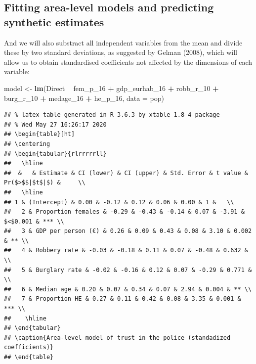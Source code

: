 \documentclass[
]{article}
\newenvironment{Shaded}{\begin{snugshade}}{\end{snugshade}}
\newcommand{\DataTypeTok}[1]{\textcolor[rgb]{0.13,0.29,0.53}{#1}}
\newcommand{\DecValTok}[1]{\textcolor[rgb]{0.00,0.00,0.81}{#1}}
\newcommand{\KeywordTok}[1]{\textcolor[rgb]{0.13,0.29,0.53}{\textbf{#1}}}
\newcommand{\NormalTok}[1]{#1}
\newcommand{\OperatorTok}[1]{\textcolor[rgb]{0.81,0.36,0.00}{\textbf{#1}}}
\newcommand{\StringTok}[1]{\textcolor[rgb]{0.31,0.60,0.02}{#1}}
\begin{document}
\hypertarget{fitting-area-level-models-and-predicting-synthetic-estimates}{%
\subsection{Fitting area-level models and predicting synthetic
estimates}\label{fitting-area-level-models-and-predicting-synthetic-estimates}}

And we will also substract all independent variables from the mean and
divide these by two standard deviations, as suggested by Gelman (2008),
which will allow us to obtain standardised coefficients not affected by
the dimensions of each variable:

\begin{Shaded}
\begin{Highlighting}[]
\NormalTok{model <-}\StringTok{ }\KeywordTok{lm}\NormalTok{(Direct }\OperatorTok{~}\StringTok{  }\NormalTok{fem_p_}\DecValTok{16}  \OperatorTok{+}\StringTok{ }\NormalTok{gdp_eurhab_}\DecValTok{16} \OperatorTok{+}\StringTok{ }\NormalTok{robb_r_}\DecValTok{10} \OperatorTok{+}\StringTok{ }
\StringTok{                      }\NormalTok{burg_r_}\DecValTok{10} \OperatorTok{+}\StringTok{  }\NormalTok{medage_}\DecValTok{16}    \OperatorTok{+}\StringTok{ }\NormalTok{he_p_}\DecValTok{16}\NormalTok{, }
            \DataTypeTok{data =}\NormalTok{ pop)}
\end{Highlighting}
\end{Shaded}

\begin{verbatim}
## % latex table generated in R 3.6.3 by xtable 1.8-4 package
## % Wed May 27 16:26:17 2020
## \begin{table}[ht]
## \centering
## \begin{tabular}{rlrrrrrll}
##   \hline
##  &   & Estimate & CI (lower) & CI (upper) & Std. Error & t value & Pr($>$$|$t$|$) &     \\ 
##   \hline
## 1 & (Intercept) & 0.00 & -0.12 & 0.12 & 0.06 & 0.00 & 1 &   \\ 
##   2 & Proportion females & -0.29 & -0.43 & -0.14 & 0.07 & -3.91 & $<$0.001 & *** \\ 
##   3 & GDP per person (€) & 0.26 & 0.09 & 0.43 & 0.08 & 3.10 & 0.002 & ** \\ 
##   4 & Robbery rate & -0.03 & -0.18 & 0.11 & 0.07 & -0.48 & 0.632 &   \\ 
##   5 & Burglary rate & -0.02 & -0.16 & 0.12 & 0.07 & -0.29 & 0.771 &   \\ 
##   6 & Median age & 0.20 & 0.07 & 0.34 & 0.07 & 2.94 & 0.004 & ** \\ 
##   7 & Proportion HE & 0.27 & 0.11 & 0.42 & 0.08 & 3.35 & 0.001 & *** \\ 
##    \hline
## \end{tabular}
## \caption{Area-level model of trust in the police (standadized coefficients)} 
## \end{table}
\end{verbatim}
\end{document}

